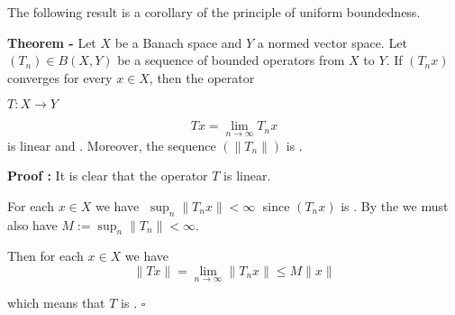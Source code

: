 \documentclass[12pt]{article}
\begin{document}
The following result is a corollary of the principle of uniform boundedness.

{\bf Theorem -} Let $X$ be a Banach space and $Y$ a normed vector space. Let $(T_n) \in B(X,Y)$ be a sequence of bounded operators from $X$ to $Y$. If $(T_nx)$ converges for every $x \in X$, then the operator
\begin{center}
$T:X \longrightarrow Y$
\end{center}

\begin{displaymath}
Tx = \lim_{n \rightarrow \infty} T_n x
\end{displaymath}
is linear and . Moreover, the sequence $(\|T_n\|)$ is .

{\bf Proof :} It is clear that the operator $T$ is linear. 

For each $x \in X$ we have $\displaystyle \;\sup_n \|T_nx\| < \infty\;$ since $(T_nx)$ is . By the  we must also have $\displaystyle M := \sup_n \|T_n\| < \infty$.

Then for each $x \in X$ we have
\begin{displaymath}
\|Tx\| = \lim_{n \rightarrow \infty} \|T_nx\| \leq M\|x\|
\end{displaymath}

which means that $T$ is . $\square$
\end{document}
